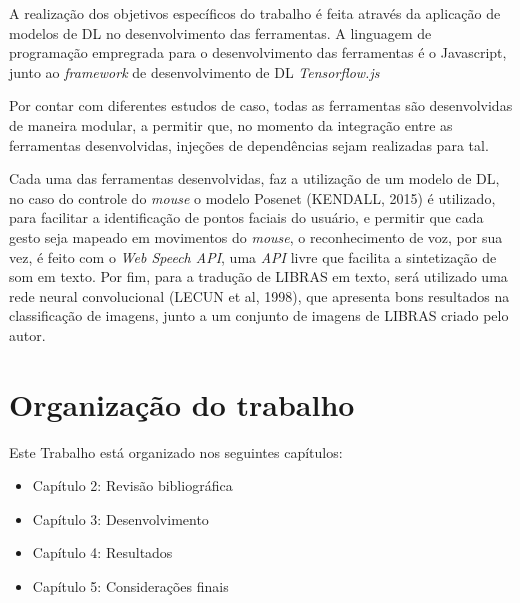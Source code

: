 A realização dos objetivos específicos do trabalho é feita através da aplicação de modelos de DL no desenvolvimento das ferramentas. A linguagem de programação empregrada para o desenvolvimento das ferramentas é o Javascript, junto ao \textit{framework} de desenvolvimento de DL \textit{Tensorflow.js}

Por contar com diferentes estudos de caso, todas as ferramentas são desenvolvidas de maneira modular, a permitir que, no momento da integração entre as ferramentas desenvolvidas, injeções de dependências sejam realizadas para tal.

Cada uma das ferramentas desenvolvidas, faz a utilização de um modelo de DL, no caso do controle do \textit{mouse} o modelo Posenet (KENDALL, 2015) é utilizado, para facilitar a identificação de pontos faciais do usuário, e permitir que cada gesto seja mapeado em movimentos do \textit{mouse}, o reconhecimento de voz, por sua vez, é feito com o \textit{Web Speech API}, uma \textit{API} livre que facilita a sintetização de som em texto. Por fim, para a tradução de LIBRAS em texto, será utilizado uma rede neural convolucional (LECUN et al, 1998), que apresenta bons resultados na classificação de imagens, junto a um conjunto de imagens de LIBRAS criado pelo autor.


\section{Organização do trabalho}

Este Trabalho está organizado nos seguintes capítulos:

\begin{itemize}
	\item Capítulo 2: Revisão bibliográfica %
	\item Capítulo 3: Desenvolvimento %
	\item Capítulo 4: Resultados %
	\item Capítulo 5: Considerações finais %
\end{itemize}
